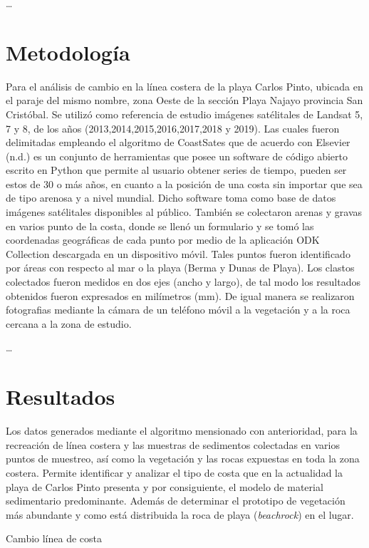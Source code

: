 \documentclass[11pt,]{article}
\begin{document}
\ldots

\section{Metodología}\label{metodologuxeda}

Para el análisis de cambio en la línea costera de la playa Carlos Pinto,
ubicada en el paraje del mismo nombre, zona Oeste de la sección Playa
Najayo provincia San Cristóbal. Se utilizó como referencia de estudio
imágenes satélitales de Landsat 5, 7 y 8, de los años
(2013,2014,2015,2016,2017,2018 y 2019). Las cuales fueron delimitadas
empleando el algoritmo de CoastSates que de acuerdo con Elsevier (n.d.)
es un conjunto de herramientas que posee un software de código abierto
escrito en Python que permite al usuario obtener series de tiempo,
pueden ser estos de 30 o más años, en cuanto a la posición de una costa
sin importar que sea de tipo arenosa y a nivel mundial. Dicho software
toma como base de datos imágenes satélitales disponibles al público.
También se colectaron arenas y gravas en varios punto de la costa, donde
se llenó un formulario y se tomó las coordenadas geográficas de cada
punto por medio de la aplicación ODK Collection descargada en un
dispositivo móvil. Tales puntos fueron identificado por áreas con
respecto al mar o la playa (Berma y Dunas de Playa). Los clastos
colectados fueron medidos en dos ejes (ancho y largo), de tal modo los
resultados obtenidos fueron expresados en milímetros (mm). De igual
manera se realizaron fotografias mediante la cámara de un teléfono móvil
a la vegetación y a la roca cercana a la zona de estudio.

\ldots

\section{Resultados}\label{resultados}

Los datos generados mediante el algoritmo mensionado con anterioridad,
para la recreación de línea costera y las muestras de sedimentos
colectadas en varios puntos de muestreo, así como la vegetación y las
rocas expuestas en toda la zona costera. Permite identificar y analizar
el tipo de costa que en la actualidad la playa de Carlos Pinto presenta
y por consiguiente, el modelo de material sedimentario predominante.
Además de determinar el prototipo de vegetación más abundante y como
está distribuida la roca de playa (\emph{beachrock}) en el lugar.

Cambio línea de costa
\end{document}
